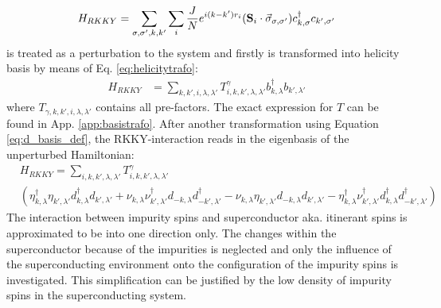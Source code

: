 \begin{equation} \nonumber
    H_{RKKY} = \sum_{\sigma, \sigma', k, k'} \sum_i \frac{J}{N}e^{i(k-k')r_i}(\vb{S}_i\cdot \Vec{\sigma}_{\sigma, \sigma'})c^{\dag}_{k,\sigma}c_{k',\sigma'}
\end{equation}
is treated as a perturbation to the system and firstly is transformed into helicity basis by means of Eq. \eqref{eq:helicitytrafo}:
\begin{align} \nonumber
    H_{RKKY} &= \sum_{k, k', i, \lambda, \lambda'} T^{ \gamma}_{i, k, k', \lambda, \lambda'} b^{\dag}_{k,\lambda}b_{k',\lambda'}
\end{align}
where $T_{\gamma, k, k', i, \lambda, \lambda'}$ contains all pre-factors. 
The exact expression for $T$ can be found in App. \ref{app:basistrafo}.\newline
After another transformation using Equation \eqref{eq:d_basis_def}, the RKKY-interaction reads in the eigenbasis of the unperturbed Hamiltonian: 
\begin{align}
    &H_{RKKY} = \sum_{i, k, k',\lambda, \lambda'} T^{ \gamma}_{i, k, k', \lambda, \lambda'} \\ \nonumber 
    &\left(
    \eta^{\dag}_{k, \lambda}\eta_{k',\lambda'} d^{\dag}_{k,\lambda}d_{k',\lambda'}
    + \nu_{k,\lambda} \nu^{\dag}_{k',\lambda'} d_{-k,\lambda}d^{\dag}_{-k',\lambda'}
    - \nu_{k,\lambda}\eta_{k',\lambda'} d_{-k,\lambda}d_{k',\lambda'} 
    - \eta^{\dag}_{k,\lambda} \nu^{\dag}_{k',\lambda'} d^{\dag}_{k,\lambda}d^{\dag}_{-k',\lambda'} \right)
\end{align}
The interaction between impurity spins and superconductor aka. itinerant spins is approximated to be into one direction only. 
The changes within the superconductor because of the impurities is neglected and only the influence of the superconducting environment onto the configuration of the impurity spins is investigated.
This simplification can be justified by the low density of impurity spins in the superconducting system.


